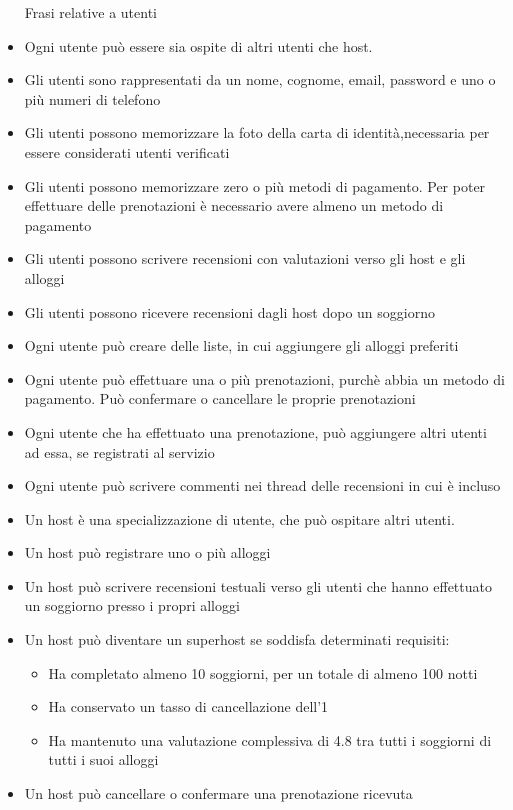 \documentclass[letterpaper]{report}
\begin{document}
\begin{itemize} Frasi relative a utenti
\item Ogni utente può essere sia ospite di altri utenti che host.
\item Gli utenti sono rappresentati da un nome, cognome, email, password e uno o più numeri di telefono
\item Gli utenti possono memorizzare la foto della carta di identità,necessaria per essere considerati utenti verificati
\item Gli utenti possono memorizzare zero o più metodi di pagamento. Per poter effettuare delle prenotazioni è necessario avere almeno un metodo di pagamento
\item Gli utenti possono scrivere recensioni con valutazioni verso gli host e gli alloggi
\item Gli utenti possono ricevere recensioni dagli host dopo un soggiorno
\item Ogni utente può creare delle liste, in cui aggiungere gli alloggi preferiti
\item Ogni utente può effettuare una o più prenotazioni, purchè abbia un metodo di pagamento. Può confermare o cancellare le proprie prenotazioni
\item Ogni utente che ha effettuato una prenotazione, può aggiungere altri utenti ad essa, se registrati al servizio
\item Ogni utente può scrivere commenti nei thread delle recensioni in cui è incluso

\end{itemize}

\begin{itemize} Frasi relative a host
\item Un host è una specializzazione di utente, che può ospitare altri utenti.
\item Un host può registrare uno o più alloggi
\item Un host può scrivere recensioni testuali verso gli utenti che hanno effettuato un soggiorno presso i propri alloggi
\item Un host può diventare un superhost se soddisfa determinati requisiti:
\begin{itemize}
 \item Ha completato almeno 10 soggiorni, per un totale di almeno 100 notti
 \item Ha conservato un tasso di cancellazione dell'1%
 \item Ha mantenuto una valutazione complessiva di 4.8 tra tutti i soggiorni di tutti i suoi alloggi
 \end{itemize}
\item Un host può cancellare o confermare una prenotazione ricevuta
\end{itemize}
\end{document}
